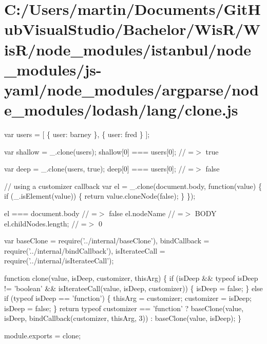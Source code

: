\hypertarget{_c_1_2_users_2martin_2_documents_2_git_hub_visual_studio_2_bachelor_2_wis_r_2_wis_r_2node_modulebd4a8145bed9da1f1f4712507570fd4c}{}\section{C\+:/\+Users/martin/\+Documents/\+Git\+Hub\+Visual\+Studio/\+Bachelor/\+Wis\+R/\+Wis\+R/node\+\_\+modules/istanbul/node\+\_\+modules/js-\/yaml/node\+\_\+modules/argparse/node\+\_\+modules/lodash/lang/clone.\+js}
var users = \mbox{[} \{ \textquotesingle{}user\textquotesingle{}\+: \textquotesingle{}barney\textquotesingle{} \}, \{ \textquotesingle{}user\textquotesingle{}\+: \textquotesingle{}fred\textquotesingle{} \} \mbox{]};

var shallow = \+\_\+.\+clone(users); shallow\mbox{[}0\mbox{]} === users\mbox{[}0\mbox{]}; // =$>$ true

var deep = \+\_\+.\+clone(users, true); deep\mbox{[}0\mbox{]} === users\mbox{[}0\mbox{]}; // =$>$ false

// using a customizer callback var el = \+\_\+.\+clone(document.\+body, function(value) \{ if (\+\_\+.\+is\+Element(value)) \{ return value.\+clone\+Node(false); \} \});

el === document.\+body // =$>$ false el.\+node\+Name // =$>$ B\+O\+D\+Y el.\+child\+Nodes.\+length; // =$>$ 0


\begin{DoxyCodeInclude}
var baseClone = require(\textcolor{stringliteral}{'../internal/baseClone'}),
    bindCallback = require(\textcolor{stringliteral}{'../internal/bindCallback'}),
    isIterateeCall = require(\textcolor{stringliteral}{'../internal/isIterateeCall'});

\textcolor{keyword}{function} clone(value, isDeep, customizer, thisArg) \{
  \textcolor{keywordflow}{if} (isDeep && typeof isDeep != \textcolor{stringliteral}{'boolean'} && isIterateeCall(value, isDeep, customizer)) \{
    isDeep = \textcolor{keyword}{false};
  \}
  \textcolor{keywordflow}{else} \textcolor{keywordflow}{if} (typeof isDeep == \textcolor{stringliteral}{'function'}) \{
    thisArg = customizer;
    customizer = isDeep;
    isDeep = \textcolor{keyword}{false};
  \}
  \textcolor{keywordflow}{return} typeof customizer == \textcolor{stringliteral}{'function'}
    ? baseClone(value, isDeep, bindCallback(customizer, thisArg, 3))
    : baseClone(value, isDeep);
\}

module.exports = clone;
\end{DoxyCodeInclude}
 
